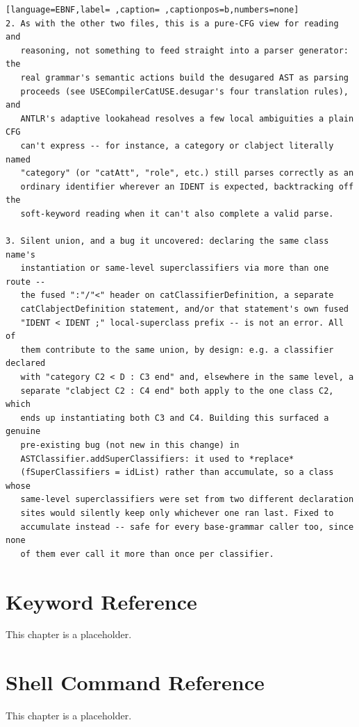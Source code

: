 \documentclass[11pt,twoside,a4paper]{book}
\begin{document}
\begin{lstlisting}[language=EBNF,label= ,caption= ,captionpos=b,numbers=none]
2. As with the other two files, this is a pure-CFG view for reading and
   reasoning, not something to feed straight into a parser generator: the
   real grammar's semantic actions build the desugared AST as parsing
   proceeds (see USECompilerCatUSE.desugar's four translation rules), and
   ANTLR's adaptive lookahead resolves a few local ambiguities a plain CFG
   can't express -- for instance, a category or clabject literally named
   "category" (or "catAtt", "role", etc.) still parses correctly as an
   ordinary identifier wherever an IDENT is expected, backtracking off the
   soft-keyword reading when it can't also complete a valid parse.

3. Silent union, and a bug it uncovered: declaring the same class name's
   instantiation or same-level superclassifiers via more than one route --
   the fused ":"/"<" header on catClassifierDefinition, a separate
   catClabjectDefinition statement, and/or that statement's own fused
   "IDENT < IDENT ;" local-superclass prefix -- is not an error. All of
   them contribute to the same union, by design: e.g. a classifier declared
   with "category C2 < D : C3 end" and, elsewhere in the same level, a
   separate "clabject C2 : C4 end" both apply to the one class C2, which
   ends up instantiating both C3 and C4. Building this surfaced a genuine
   pre-existing bug (not new in this change) in
   ASTClassifier.addSuperClassifiers: it used to *replace*
   (fSuperClassifiers = idList) rather than accumulate, so a class whose
   same-level superclassifiers were set from two different declaration
   sites would silently keep only whichever one ran last. Fixed to
   accumulate instead -- safe for every base-grammar caller too, since none
   of them ever call it more than once per classifier.
\end{lstlisting}
\chapter{Keyword Reference}
\label{sec:orgfa8ba54}
This chapter is a placeholder.
\chapter{Shell Command Reference}
\label{sec:org1586b85}
This chapter is a placeholder.

\backmatter

\printindex
\end{document}
